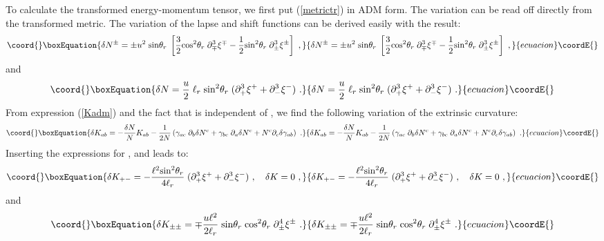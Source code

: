 \documentclass[a4paper,12pt,oneside]{article}
\begin{document}
To calculate the transformed energy-momentum tensor, we first put
(\ref{metrictr}) in 
 ADM form. The variation   \coordHE{} can be 
read off directly
from  the transformed metric. The variation of the lapse and
shift functions can be derived easily with the result:
\begin{equation}\coord{}\boxEquation{
\delta N^\pm = \pm {u^2}\;{\rm sin}\theta_r\;
\left[{3\over 2}{\rm cos}^2\theta_r \; \partial_\mp^3\xi^\mp -
{1\over 2}{\rm sin}^2\theta_r \; \partial_\pm^3\xi^\pm\right]\ , 
}{
\delta N^\pm = \pm {u^2}\;{\rm sin}\theta_r\;
\left[{3\over 2}{\rm cos}^2\theta_r \; \partial_\mp^3\xi^\mp -
{1\over 2}{\rm sin}^2\theta_r \; \partial_\pm^3\xi^\pm\right]\ , 
}{ecuacion}\coordE{}\end{equation}
and
\begin{equation}\coord{}\boxEquation{
\delta N = {u \over 2}\;\ell_r\; {\rm sin}^2\theta_r
\; (\partial_+^3\xi^+ +
\partial_-^3\xi^-)\ .
}{
\delta N = {u \over 2}\;\ell_r\; {\rm sin}^2\theta_r
\; (\partial_+^3\xi^+ +
\partial_-^3\xi^-)\ .
}{ecuacion}\coordE{}\end{equation}
From  expression (\ref{Kadm}) 
and the fact that \coordHE{} is independent
of \coordHE{},   we find the following variation of  the extrinsic curvature:
\begin{equation}\coord{}\boxEquation{
\delta K_{ab} = -{\delta N\over N} K_{ab} -{1\over 2N} \left(
\gamma_{ac}\;\partial_b\delta N^c+ \gamma_{bc}\;\partial_a\delta
 N^c +N^c\partial_c\delta\gamma_{ab}\right)
\ .
}{
\delta K_{ab} = -{\delta N\over N} K_{ab} -{1\over 2N} \left(
\gamma_{ac}\;\partial_b\delta N^c+ \gamma_{bc}\;\partial_a\delta
 N^c +N^c\partial_c\delta\gamma_{ab}\right)
\ .
}{ecuacion}\coordE{}\end{equation}
Inserting the expressions for \coordHE{}, \coordHE{}
and \coordHE{}  leads to:
\begin{equation}\coord{}\boxEquation{
\delta K_{+-} = -{\ell^2 
{\rm sin}^2\theta_r\over 4\ell_r}\; (\partial_+^3\xi^+ +
\partial_-^3\xi^-)\ , \ \ \ 
\delta K = 0\ ,
}{
\delta K_{+-} = -{\ell^2 
{\rm sin}^2\theta_r\over 4\ell_r}\; (\partial_+^3\xi^+ +
\partial_-^3\xi^-)\ , \ \ \ 
\delta K = 0\ ,
}{ecuacion}\coordE{}\end{equation}
and 
\begin{equation}\coord{}\boxEquation{
\delta K_{\pm\pm} = \mp {u \ell^2 \over 2\ell_r}\;{\rm sin}\theta_r\;
{\rm cos}^2\theta_r\; \partial^4_\pm\xi^\pm\ . 
}{
\delta K_{\pm\pm} = \mp {u \ell^2 \over 2\ell_r}\;{\rm sin}\theta_r\;
{\rm cos}^2\theta_r\; \partial^4_\pm\xi^\pm\ . 
}{ecuacion}\coordE{}\end{equation}
\end{document}
